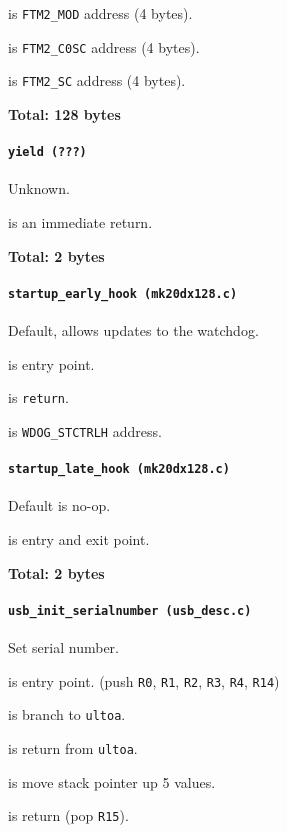  is \texttt{FTM2\_MOD} address (4 bytes).

 is \texttt{FTM2\_C0SC} address (4 bytes).

 is \texttt{FTM2\_SC} address (4 bytes).

\textbf{Total: 128 bytes}

\paragraph{\texttt{yield (???)}} Unknown.

 is an immediate return.

\textbf{Total: 2 bytes}

\paragraph{\texttt{startup\_early\_hook (mk20dx128.c)}} Default, allows updates
to the watchdog.

 is entry point.

 is \texttt{return}.

 is \texttt{WDOG\_STCTRLH} address.

\paragraph{\texttt{startup\_late\_hook (mk20dx128.c)}} Default is no-op.

 is entry and exit point.

\textbf{Total: 2 bytes}

\paragraph{\texttt{usb\_init\_serialnumber (usb\_desc.c)}} Set serial number.

 is entry point.
(push \texttt{R0}, \texttt{R1}, \texttt{R2}, \texttt{R3},
\texttt{R4}, \texttt{R14})

 is branch to \texttt{ultoa}.

 is return from \texttt{ultoa}.

 is move stack pointer up 5 values.

 is return (pop \texttt{R15}).

